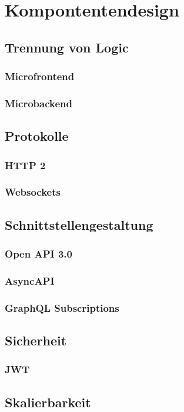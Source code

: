 \chapter{Kompontentendesign}



\section{Trennung von Logic}
% 

\subsection{Microfrontend}

\subsection{Microbackend}

\section{Protokolle}
\subsection{HTTP 2}
\subsection{Websockets}

\section{Schnittstellengestaltung}

\subsection{Open API 3.0}
\subsection{AsyncAPI}
\subsection{GraphQL Subscriptions}

\section{Sicherheit}
\subsection{JWT}

\section{Skalierbarkeit}
